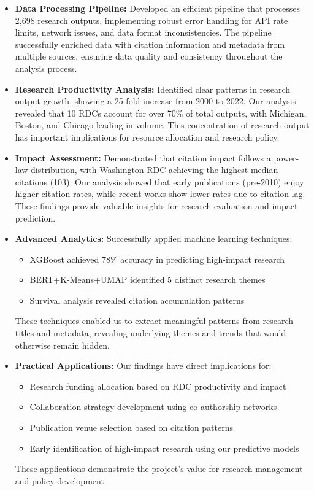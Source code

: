 \documentclass[12pt]{article}
\begin{document}
\begin{itemize}
    \item \textbf{Data Processing Pipeline:} Developed an efficient pipeline that processes 2,698 research outputs, implementing robust error handling for API rate limits, network issues, and data format inconsistencies. The pipeline successfully enriched data with citation information and metadata from multiple sources, ensuring data quality and consistency throughout the analysis process.
    
    \item \textbf{Research Productivity Analysis:} Identified clear patterns in research output growth, showing a 25-fold increase from 2000 to 2022. Our analysis revealed that 10 RDCs account for over 70\% of total outputs, with Michigan, Boston, and Chicago leading in volume. This concentration of research output has important implications for resource allocation and research policy.
    
    \item \textbf{Impact Assessment:} Demonstrated that citation impact follows a power-law distribution, with Washington RDC achieving the highest median citations (103). Our analysis showed that early publications (pre-2010) enjoy higher citation rates, while recent works show lower rates due to citation lag. These findings provide valuable insights for research evaluation and impact prediction.
    
    \item \textbf{Advanced Analytics:} Successfully applied machine learning techniques:
    \begin{itemize}
        \item XGBoost achieved 78\% accuracy in predicting high-impact research
        \item BERT+K-Means+UMAP identified 5 distinct research themes
        \item Survival analysis revealed citation accumulation patterns
    \end{itemize}
    These techniques enabled us to extract meaningful patterns from research titles and metadata, revealing underlying themes and trends that would otherwise remain hidden.
    
    \item \textbf{Practical Applications:} Our findings have direct implications for:
    \begin{itemize}
        \item Research funding allocation based on RDC productivity and impact
        \item Collaboration strategy development using co-authorship networks
        \item Publication venue selection based on citation patterns
        \item Early identification of high-impact research using our predictive models
    \end{itemize}
    These applications demonstrate the project's value for research management and policy development.
\end{itemize}
\end{document}
